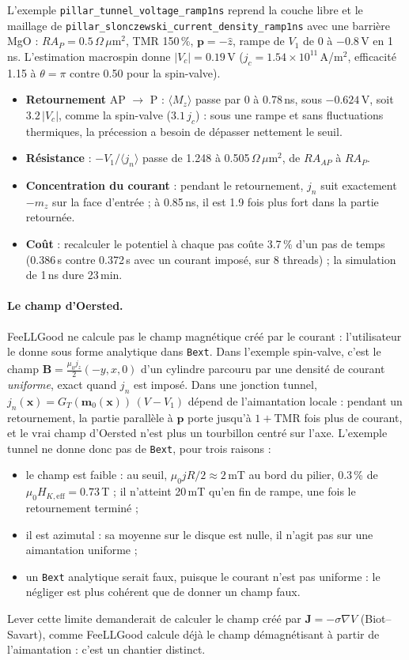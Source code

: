 \documentclass[11pt,a4paper]{article}
\newcommand{\vm}{\bm{m}}
\newcommand{\vp}{\bm{p}}
\begin{document}
L'exemple \texttt{pillar\_tunnel\_voltage\_ramp1ns} reprend la couche libre
et le maillage de \texttt{pillar\_slonczewski\_current\_density\_ramp1ns}
avec une barrière MgO : $RA_P = 0.5\,\Omega\,\mu$m$^2$, TMR 150\,\%,
$\vp = -\hat z$, rampe de $V_1$ de 0 à $-0.8$\,V en 1\,ns. L'estimation
macrospin donne $|V_c| = 0.19$\,V ($j_c = 1.54\times10^{11}$\,A/m$^2$,
efficacité 1.15 à $\theta = \pi$ contre 0.50 pour la spin-valve).
\begin{itemize}
  \item \textbf{Retournement} AP $\to$ P : $\langle M_z\rangle$ passe par 0 à
    0.78\,ns, sous $-0.624$\,V, soit $3.2\,|V_c|$, comme la spin-valve
    ($3.1\,j_c$) : sous une rampe et sans fluctuations thermiques, la
    précession a besoin de dépasser nettement le seuil.
  \item \textbf{Résistance} : $-V_1/\langle j_n\rangle$ passe de 1.248 à
    0.505\,$\Omega\,\mu$m$^2$, de $RA_{AP}$ à $RA_P$.
  \item \textbf{Concentration du courant} : pendant le retournement, $j_n$
    suit exactement $-m_z$ sur la face d'entrée ; à 0.85\,ns, il est 1.9
    fois plus fort dans la partie retournée.
  \item \textbf{Coût} : recalculer le potentiel à chaque pas coûte 3.7\,\%
    d'un pas de temps (0.386\,s contre 0.372\,s avec un courant imposé, sur
    8 threads) ; la simulation de 1\,ns dure 23\,min.
\end{itemize}

\paragraph{Le champ d'Oersted.} FeeLLGood ne calcule pas le champ magnétique
créé par le courant : l'utilisateur le donne sous forme analytique dans
\texttt{Bext}. Dans l'exemple spin-valve, c'est le champ
$\bm{B} = \frac{\mu_0j_z}{2}(-y, x, 0)$ d'un cylindre parcouru par une
densité de courant \emph{uniforme}, exact quand $j_n$ est imposé. Dans une
jonction tunnel, $j_n(\bm{x}) = G_T(\vm_0(\bm{x}))\,(V-V_1)$ dépend de
l'aimantation locale : pendant un retournement, la partie parallèle à $\vp$
porte jusqu'à $1+\mathrm{TMR}$ fois plus de courant, et le vrai champ
d'Oersted n'est plus un tourbillon centré sur l'axe. L'exemple tunnel ne
donne donc pas de \texttt{Bext}, pour trois raisons :
\begin{itemize}
  \item le champ est faible : au seuil, $\mu_0 j R/2\approx2$\,mT au bord du
    pilier, 0.3\,\% de $\mu_0H_{K,\mathrm{eff}} = 0.73$\,T ; il n'atteint
    20\,mT qu'en fin de rampe, une fois le retournement terminé ;
  \item il est azimutal : sa moyenne sur le disque est nulle, il n'agit pas
    sur une aimantation uniforme ;
  \item un \texttt{Bext} analytique serait faux, puisque le courant n'est
    pas uniforme : le négliger est plus cohérent que de donner un champ
    faux.
\end{itemize}
Lever cette limite demanderait de calculer le champ créé par
$\bm{J} = -\sigma\nabla V$ (Biot--Savart), comme FeeLLGood calcule déjà le
champ démagnétisant à partir de l'aimantation : c'est un chantier distinct.
\end{document}
